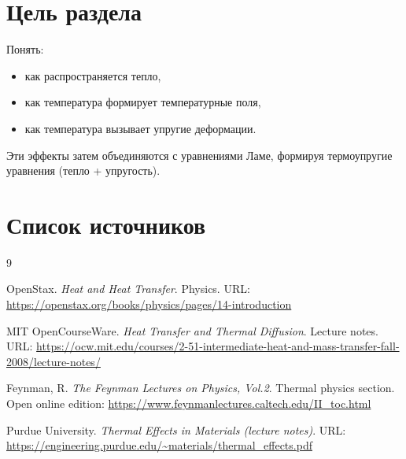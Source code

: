 \section*{Цель раздела}

Понять:
\begin{itemize}
\item как распространяется тепло,
\item как температура формирует температурные поля,
\item как температура вызывает упругие деформации.
\end{itemize}
Эти эффекты затем объединяются с уравнениями Ламе, формируя термоупругие уравнения (тепло + упругость).


\section*{Список источников}

\begin{thebibliography}{9}

OpenStax. \textit{Heat and Heat Transfer}. Physics.  
URL: \url{https://openstax.org/books/physics/pages/14-introduction}

MIT OpenCourseWare. \textit{Heat Transfer and Thermal Diffusion}. Lecture notes.  
URL: \url{https://ocw.mit.edu/courses/2-51-intermediate-heat-and-mass-transfer-fall-2008/lecture-notes/}

Feynman, R. \textit{The Feynman Lectures on Physics, Vol.2}. Thermal physics section.  
Open online edition: \url{https://www.feynmanlectures.caltech.edu/II_toc.html}

Purdue University. \textit{Thermal Effects in Materials (lecture notes)}.  
URL: \url{https://engineering.purdue.edu/~materials/thermal_effects.pdf}

\end{thebibliography}
